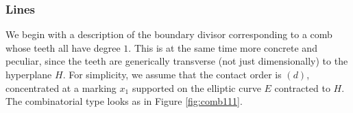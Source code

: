 \documentclass[11pt]{amsart}
\newcommand{\sqC}{\scalebox{0.8}[1.3]{$\sqsubset$}}
\newcommand{\PP}{\mathbb P}
\theoremstyle{definition}
\theoremstyle{definition}
\begin{document}
\begin{comment}

\begin{proof}[Proof of Lemma \ref{lem:corecontact}]
Consider the vertices that lie above $0\in\mathbb R_{\geq0}$ on the circle of radius $\delta$: the edges departing from them go directly (up to bubbling) to the core, since there cannot be stable vertices inside the open disc  when we have only one tropical parameter. In particular, all these edges have the same expansion factor $m$ (see again Figure \ref{fig:off_we_go}), which is maximal among those of the edges adjacent to the core. Indeed, all the edges from the core to the circle have the same length $\delta$, so the ones having maximal contact order are those that reach further from the core, and at least one must reach $0\in\mathbb R_{\geq0}$, for otherwise there would be an extra tropical parameter.

Finally, in case the maximal contact order is $m=1$, in order for $f_B$ to factor, the image of the tangent vectors at the components lying on the circle must be linearly dependent in $T_{\PP^N,x}$, where $x$ denotes the image of the core under $f_B$.in which case we can deduce as above that factorisation will be satisfied independently of the choice of alignment.
\end{proof}

For the remainder of this section we use the following notation for the combinatorial type $\Delta$; we let $\sqC_0$ denotes the vertex of dual graph corresponding to the core, $\sqC_1,\ldots,\sqC_r$ the other stable vertices (genus zero and lying on the circle, by the previous lemma) and $q_1,\ldots,q_r$ the corresponding splitting nodes.
 
\end{comment}
\subsubsection{Lines}\label{S:lines}
We begin with a description of the boundary divisor corresponding to a comb whose teeth all have degree $1$. This is at the same time more concrete and peculiar, since the teeth are generically transverse (not just dimensionally) to the hyperplane $H$. For simplicity, we assume that the contact order is $(d)$, concentrated at a marking $x_1$ supported on the elliptic curve $E$ contracted to $H$. The combinatorial type looks as in Figure \ref{fig:comb111}.
\end{document}
